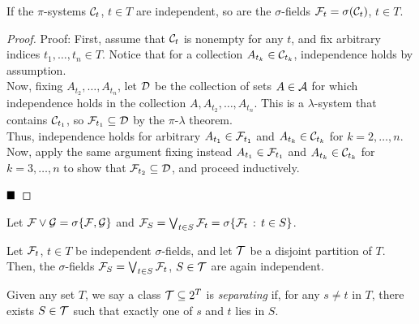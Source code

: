 \begin{lemma}
    If the $\pi$-systems $\cal{C}_t$, $t \in T$ are independent, so are the $\sigma$-fields $\cal{F}_t = \sigma(\cal{C}_t)$, $t \in T$.
\end{lemma}
\begin{proof}{Proof:}
    First, assume that $\cal{C}_{t}$ is nonempty for any $t$, and fix arbitrary indices $t_1, \ldots, t_n \in T$. Notice that for a collection $A_{t_k} \in \cal{C}_{t_k}$, independence holds by assumption.\\

    Now, fixing $A_{t_2}, \ldots, A_{t_n}$, let $\cal{D}$ be the collection of sets $A \in \cal{A}$ for which independence holds in the collection $A, A_{t_2}, \ldots, A_{t_n}$. This is a $\lambda$-system that contains $\cal{C}_{t_1}$, so $\cal{F}_{t_1} \subseteq \cal{D}$ by the $\pi$-$\lambda$ theorem.\\

    Thus, independence holds for arbitrary $A_{t_1} \in \cal{F}_{t_1}$ and $A_{t_k} \in \cal{C}_{t_k}$ for $k = 2, \ldots, n$.\\

    Now, apply the same argument fixing instead $A_{t_1} \in \cal{F}_{t_1}$ and $A_{t_k} \in \cal{C}_{t_k}$ for $k = 3, \ldots, n$ to show that $\cal{F}_{t_2} \subseteq \cal{D}$, and proceed inductively.

    $\qed$
\end{proof}

Let $\cal{F} \vee \cal{G} = \sigma\{\cal{F}, \cal{G}\}$ and $\cal{F}_S = \bigvee_{t \in S} \cal{F}_t = \sigma\{\cal{F}_t \col t \in S\}$.

\begin{lemma}
    Let $\cal{F}_t$, $t \in T$ be independent $\sigma$-fields, and let $\cal{T}$ be a disjoint partition of $T$. Then, the $\sigma$-fields $\cal{F}_S = \bigvee_{t \in S} \cal{F}_t$, $S \in \cal{T}$ are again independent.
\end{lemma}


\begin{definition}
    Given any set $T$, we say a class $\cal{T} \subseteq 2^{T}$ is \emph{separating} if, for any $s \neq t$ in $T$, there exists $S \in \cal{T}$ such that exactly one of $s$ and $t$ lies in $S$.
\end{definition}


